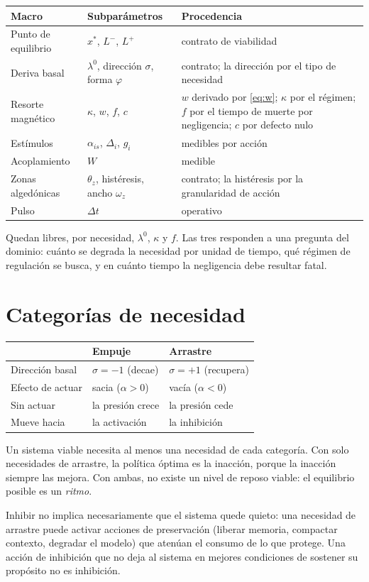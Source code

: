 \documentclass[11pt,a4paper]{article}
\begin{document}
\begin{center}
\begin{tabular}{llp{6.2cm}}
\toprule
\textbf{Macro} & \textbf{Subparámetros} & \textbf{Procedencia}\\
\midrule
Punto de equilibrio & $x^{*}$, $L^{-}$, $L^{+}$ & contrato de viabilidad\\
Deriva basal & $\lambda^{0}$, dirección $\sigma$, forma $\varphi$ & contrato; la dirección por el tipo de necesidad\\
Resorte magnético & $\kappa$, $w$, $f$, $c$ & $w$ derivado por \eqref{eq:w}; $\kappa$ por el régimen; $f$ por el tiempo de muerte por negligencia; $c$ por defecto nulo\\
Estímulos & $\alpha_{is}$, $\Delta_i$, $g_i$ & medibles por acción\\
Acoplamiento & $W$ & medible\\
Zonas algedónicas & $\theta_z$, histéresis, ancho $\omega_z$ & contrato; la histéresis por la granularidad de acción\\
Pulso & $\Delta t$ & operativo\\
\bottomrule
\end{tabular}
\end{center}

Quedan libres, por necesidad, $\lambda^{0}$, $\kappa$ y $f$. Las tres responden a una
pregunta del dominio: cuánto se degrada la necesidad por unidad de tiempo, qué régimen de
regulación se busca, y en cuánto tiempo la negligencia debe resultar fatal.

\section{Categorías de necesidad}

\begin{center}
\begin{tabular}{lll}
\toprule
& \textbf{Empuje} & \textbf{Arrastre}\\
\midrule
Dirección basal & $\sigma=-1$ (decae) & $\sigma=+1$ (recupera)\\
Efecto de actuar & sacia ($\alpha>0$) & vacía ($\alpha<0$)\\
Sin actuar & la presión crece & la presión cede\\
Mueve hacia & la activación & la inhibición\\
\bottomrule
\end{tabular}
\end{center}

Un sistema viable necesita al menos una necesidad de cada categoría. Con solo necesidades
de arrastre, la política óptima es la inacción, porque la inacción siempre las mejora. Con
ambas, no existe un nivel de reposo viable: el equilibrio posible es un \emph{ritmo}.

Inhibir no implica necesariamente que el sistema quede quieto: una necesidad de arrastre
puede activar acciones de preservación (liberar memoria, compactar contexto, degradar el
modelo) que atenúan el consumo de lo que protege. Una acción de inhibición que no deja al
sistema en mejores condiciones de sostener su propósito no es inhibición.
\end{document}
